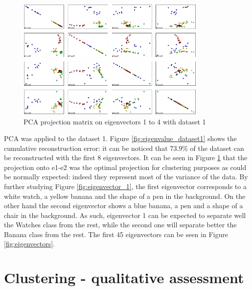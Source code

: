 \documentclass[a4paper,10pt]{article}
\begin{document}
\begin{figure}[H]
  \centering
  \includegraphics[height = 6cm]{pictures/PCA_projections}
  \caption{PCA projection matrix on eigenvectors 1 to 4 with dataset 1}
  \label{fig:PCA_matrix}
\end{figure}

PCA was applied to the dataset 1. Figure \ref{fig:eigenvalue_dataset1} shows the cumulative reconstruction error: it can be noticed that 73.9\% of the dataset can be reconstructed with the first 8 eigenvectors. 
It can be seen in Figure \ref{fig:PCA_matrix} that the projection onto e1-e2 was the optimal projection for clustering purposes as could be normally expected: indeed they represent most of the variance of the data. By further studying Figure \ref{fig:eigenvector_1}, the first eigenvector corresponds to a white watch, a yellow banana and the shape of a pen in the background. On the other hand the second eigenvector shows a blue banana, a pen and a shape of a chair in the background. As such, eigenvector 1 can be expected to separate well the Watches class from the rest, while the second one will separate better the Banana class from the rest. The first 45 eigenvectors can be seen in Figure \ref{fig:eigenvectors}.

\section{Clustering - qualitative assessment}
\end{document}
